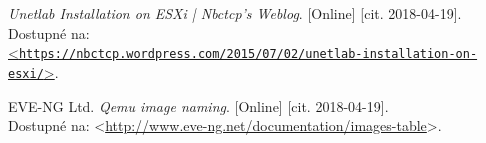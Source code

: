 \begin{thebibliography}{99}
{\it Unetlab Installation on ESXi | Nbctcp's Weblog}. [Online] [cit. 2018-04-19]. \\
Dostupné na:\\
\href{https://nbctcp.wordpress.com/2015/07/02/unetlab-installation-on-esxi/}{<\texttt{https://nbctcp.wordpress.com/2015/07/02/unetlab-installation-on-esxi/}>}.

EVE-NG Ltd. {\it Qemu image naming}. [Online] [cit. 2018-04-19]. \\
Dostupné na: <\url{http://www.eve-ng.net/documentation/images-table}>.

\end{thebibliography}